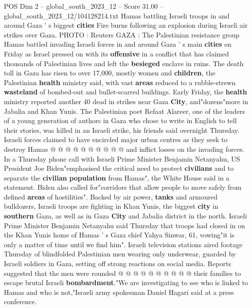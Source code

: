 \begin{textsample}{POS Dim 2 – global\_south\_2023\_12 – Score 31.00 – global\_south\_2023\_12/104128214.txt}  \label{ex:f2_pos_024}
Hamas battling Israeli troops in and around Gaza ' s biggest \textbf{cities} Fire burns following an explosion during Israeli air strikes over Gaza.
PHOTO : Reuters GAZA : The Palestinian resistance group Hamas battled invading Israeli forces in and around Gaza ' s main \textbf{cities} on Friday as Israel pressed on with its \textbf{offensive} in a conflict that has claimed thousands of Palestinian lives and left the \textbf{besieged} enclave in ruins.
The death toll in Gaza has risen to over 17,000, mostly women and \textbf{children}, the Palestinian \textbf{health} ministry said, with vast \textbf{areas} reduced to a rubble-strewn \textbf{wasteland} of bombed-out and bullet-scarred buildings.
Early Friday, the \textbf{health} ministry reported another 40 dead in strikes near Gaza \textbf{City}, and"dozens"more in Jabalia and Khan Yunis.
The Palestinian poet Refaat Alareer, one of the leaders of a young generation of authors in Gaza who chose to write in English to tell their stories, was killed in an Israeli strike, his friends said overnight Thursday.
Israeli forces claimed to have encircled major urban centres as they seek to destroy Hamas @ @ @ @ @ @ @ @ @ @ and inflict losses on the invading forces.
In a Thursday phone call with Israeli Prime Minister Benjamin Netanyahu, US President Joe Biden"emphasised the critical need to protect \textbf{civilians} and to separate the \textbf{civilian} \textbf{population} from Hamas", the White House said in a statement.
Biden also called for"corridors that allow people to move safely from defined \textbf{areas} of hostilities".
Backed by air power, \textbf{tanks} and armoured bulldozers, Israeli troops are fighting in Khan Yunis, the biggest \textbf{city} in \textbf{southern} Gaza, as well as in Gaza \textbf{City} and Jabalia district in the north.
Israeli Prime Minister Benjamin Netanyahu said Thursday that troops had closed in on the Khan Yunis home of Hamas ' s Gaza chief Yahya Sinwar, 61, vowing"it is only a matter of time until we find him".
Israeli television stations aired footage Thursday of blindfolded Palestinian men wearing only underwear, guarded by Israeli soldiers in Gaza, setting off strong reactions on social media.
Reports suggested that the men were rounded @ @ @ @ @ @ @ @ @ @ their families to escape brutal Israeli \textbf{bombardment}."We are investigating to see who is linked to Hamas and who is not,"Israeli army spokesman Daniel Hagari said at a press conference.

\end{textsample}
